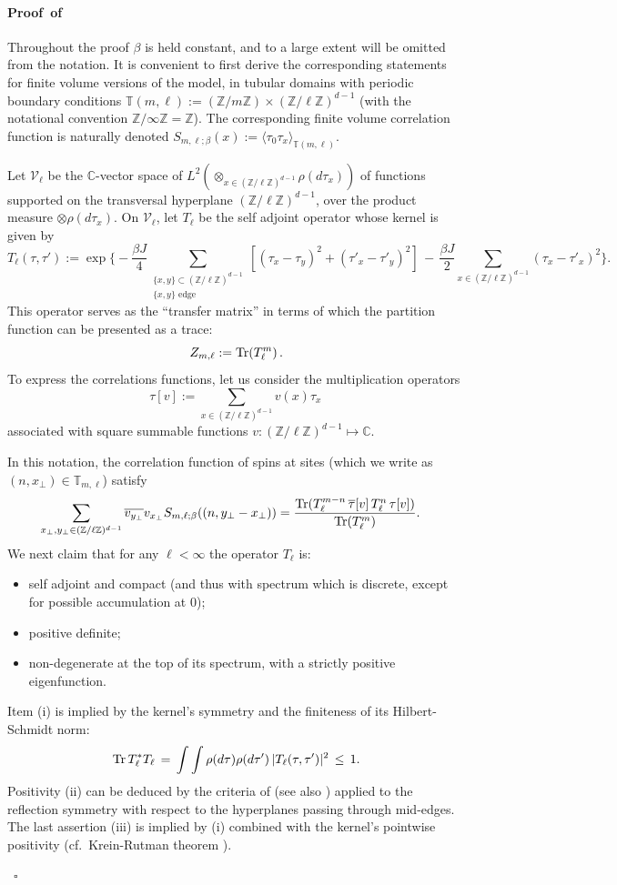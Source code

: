 \documentclass[a4paper,oneside,11pt]{article}
\def\Z{\mathbb{Z}}                          %
\newcommand{\be}[1]{\begin{equation}\label{#1}}
\newcommand{\ee}{\end{equation}}
\numberwithin{equation}{section}
\numberwithin{equation}{section}
\numberwithin{equation}{section}
\newenvironment{proof}[1][\relax]%
  {\paragraph{Proof\ifx#1\relax\else~of #1\fi}}%
  {~\hfill$\square$\par\bigskip}
\newcommand{\calV}{\mathcal{V}}
\newcommand{\bbC}{\mathbb{C}}
\newcommand{\bbT}{\mathbb{T}}
\newcommand{\bbZ}{\mathbb{Z}}
\def\Z{\mathbb{Z}}                          %
\def\be{\begin{equation}}
\def\ee{\end{equation}}
\begin{document}
\begin{proof}  Throughout the proof $\beta$ is held constant, and  to a large extent will be omitted from the notation. 
It is convenient to first derive the corresponding statements for finite volume versions of the model,  in tubular domains with periodic boundary conditions $\bbT(m,\ell):=(\bbZ/m\bbZ)\times (\bbZ/\ell\bbZ)^{d-1}$ (with the notational convention
$\bbZ/\infty\bbZ=\bbZ$).   The corresponding finite volume correlation function is naturally denoted 
$S_{m,\ell;\beta}(x):=\langle\tau_0 \tau_x\rangle_{\bbT(m,\ell)}$.

Let $\calV_\ell$ be the $\bbC$-vector space   of 
$L^2(\otimes_{x\in (\bbZ/\ell\bbZ)^{d-1}} \rho(d\tau_x))$ 
 of functions supported on the transversal hyperplane $(\bbZ/\ell\bbZ)^{d-1}$, over the product measure $\otimes \rho(d\tau_x)$. 
 On $\calV_\ell$, let $T_\ell$  be the  self adjoint operator whose  kernel is given by
\be 
T_\ell(\tau,{\tau'}):=\exp\Big\{-\frac{\beta J}{4} \sum_{\substack{\{x,y\}\subset(\bbZ/\ell\bbZ)^{d-1}\\ \{x,y\}\text{ edge}}} [ (\tau_x-\tau_y)^2 +(\tau'_x-\tau'_y)^2] \, -\, \frac{\beta J}{2}\sum_{x\in(\bbZ/\ell\bbZ)^{d-1}}(\tau_x -\tau'_x)^2\Big\} . 
\ee
This operator serves as the ``transfer matrix'' in terms of which the partition function can be presented as a trace: 
\be 
Z_{m,\ell}:= {\rm Tr}(T_\ell^{m})   \,.
\ee 
To express the correlations functions, let us consider the multiplication operators 
\be 
\tau[v]     :=   \sum_{x\in (\Z/\ell\bbZ)^{d-1}}v(x) \tau_x  \, 
\ee
 associated with square summable functions $ v:  (\Z/\ell\bbZ)^{d-1} \longmapsto \bbC$.  


In this notation, the correlation function   
of spins %
 at sites (which we write as $(n,x_\perp)\in \bbT_{m,\ell}$) satisfy
\begin{align} \label{eq:212}
\sum_{x_\perp,y_\perp\in (\bbZ/\ell\bbZ)^{d-1}}\overline{v_{y_\perp}}v_{x_\perp} S_{m,\ell;\beta}((n,y_\perp-x_\perp))
&=\frac{{\rm Tr}(T_\ell^{m-n}\, \overline \tau[v]  \, T_\ell^n\, \tau[v])}{{\rm Tr}(T_\ell^{m})}.
\end{align}
We next claim  that for any $\ell<\infty$ the operator $T_\ell $ is: \begin{itemize}[noitemsep,nolistsep]
\item[(i)] self adjoint and compact  (and thus with spectrum which is discrete, except for possible accumulation at $0$);
\item[(ii)] positive definite;
\item[(iii)] non-degenerate at the top of its spectrum, with a strictly positive eigenfunction. 
 \end{itemize} 
Item (i) is implied by the kernel's symmetry and the finiteness of its Hilbert-Schmidt norm:
\be 
{\rm Tr} \,  T_\ell ^*T_\ell \, =\,  \int  \int \rho(d\tau) \rho(d\tau')\,  |T_\ell(\tau,{\tau'})|^2 \, \leq  \, 1  .
\ee   
Positivity (ii) can be deduced by the criteria of \cite{FroSimSpe76} (see also \cite{Bis09}) applied to the reflection symmetry with respect to the hyperplanes passing through mid-edges.  The last assertion (iii) is implied by (i)  combined with the kernel's pointwise positivity  (cf.~Krein-Rutman theorem  \cite{KrRu}).   
 

\end{proof}
\end{document}
